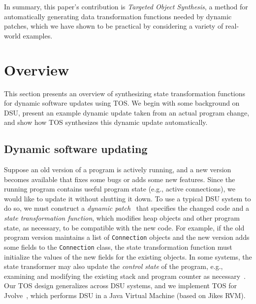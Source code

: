 \documentclass[natbib]{sigplanconf}
\newcommand{\code}[1]{\lstinline|#1|\xspace}
\newcommand{\TOS}{TOS\xspace}
\begin{document}
In summary, this paper's contribution is \emph{Targeted Object
  Synthesis}, a method for automatically generating data
transformation functions needed by dynamic patches, which we have
shown to be practical by considering a variety of real-world examples.

\section{Overview}
\label{sec:overview}

This section presents an overview of synthesizing state transformation
functions for dynamic software updates using \TOS.  We begin with some
background on DSU, present an example dynamic update taken from an
actual program change, and show how \TOS synthesizes this dynamic update
automatically.

\subsection{Dynamic software updating}

Suppose an old version of a program is actively running, and a new
version becomes available that fixes some bugs or adds some new
features.  Since the running program contains useful program state
(e.g., active connections), we would like to update it without
shutting it down.  To use a typical DSU system to do so, we must
construct a \emph{dynamic patch}~\cite{HicksNettles03} that specifies
the changed code and a \emph{state transformation function}, which
modifies heap objects and other program state, as necessary, to be
compatible with the new code.  For example, if the old program version
maintains a list of \code{Connection} objects and the new version adds
some fields to the \code{Connection} class, the state transformation
function must initialize the values of the new fields for the existing
objects.  In some systems, the state transformer may also update the
\emph{control state} of the program, e.g., examining and modifying the
existing stack and program counter as necessary~\cite{upstare,jvolve}.
Our \TOS design generalizes across DSU systems, and we implement \TOS
for Jvolve~\cite{jvolve}, which performs DSU in a Java Virtual
Machine (based on Jikes RVM).
\end{document}
